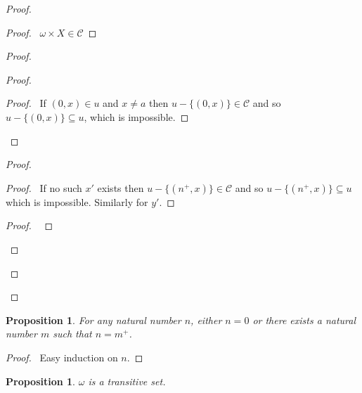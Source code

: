 \documentclass{report}
\let\qed\relax
\newtheorem{prop}[ax]{Proposition}
\theoremstyle{definition}
\begin{document}
\begin{proof}
\pf
{}
\begin{proof}
	\pf\ $\omega \times X \in \mathcal{C}$
\end{proof}
\begin{proof}
	\begin{proof}
		\begin{proof}
			\pf\ If $(0,x) \in u$ and $x \neq a$ then $u - \{(0,x)\} \in \mathcal{C}$ and so $u - \{(0,x)\} \subseteq u$, which is impossible.
		\end{proof}
	\end{proof}
	\begin{proof}
		\begin{proof}
			\pf\ If no such $x'$ exists then $u - \{(n^+,x)\} \in \mathcal{C}$ and so $u - \{(n^+,x)\} \subseteq u$ which is impossible. Similarly for $y'$.
		\end{proof}
		\begin{proof}
			\pf\ 
		\end{proof}
	\end{proof}
\end{proof}
\qed
\end{proof}

\begin{prop}
For any natural number $n$, either $n = 0$ or there exists a natural number $m$ such that $n = m^+$.
\end{prop}

\begin{proof}
\pf\ Easy induction on $n$. \qed
\end{proof}

\begin{prop}
$\omega$ is a transitive set.
\end{prop}
\end{document}

